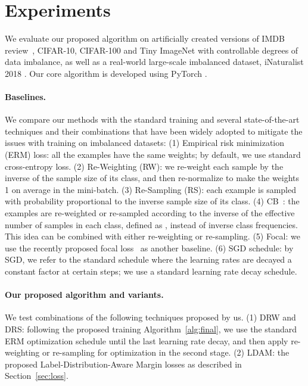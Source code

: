 \documentclass{article}
\newcommand{\ldam}{\textup{LDAM}}
\newcommand{\BMCE}{{\ldam}}
\newcommand{\tstagew}{DRW}
\newcommand{\tstages}{DRS}
\newcommand{\ERM}{ERM}
\begin{document}
\section{Experiments} \label{sec:experiments}

We evaluate our proposed algorithm on artificially created versions of IMDB review~\citep{maas2011learning}, CIFAR-10, CIFAR-100 \citep{krizhevsky2009learning}  and Tiny ImageNet \citep{russakovsky2015imagenet,tinyimagenet} with controllable degrees of data imbalance, as well as a real-world large-scale imbalanced dataset, iNaturalist 2018 \citep{van2018inaturalist}. Our core algorithm is developed using PyTorch \citep{paszke2017automatic}.
\paragraph{Baselines.}
We compare our methods with the standard training and several state-of-the-art techniques and their combinations that have been widely adopted to mitigate the issues with training on imbalanced datasets: (1) Empirical risk minimization (ERM) loss: all the examples have the same weights; by default, we use standard cross-entropy loss.  (2) Re-Weighting (RW): we re-weight each sample by the inverse of the sample size of its class, and then re-normalize to make the weights 1 on average in the mini-batch. (3) Re-Sampling (RS): each example is sampled with probability proportional to the inverse sample size of its class. (4) CB~\citep{cui2019classbalancedloss}: the examples are re-weighted or re-sampled according to the inverse of the effective number of samples in each class, defined as , instead of inverse class frequencies. This idea can be combined with either re-weighting or re-sampling. (5) Focal: we use the recently proposed focal loss~\citep{lin2017focal} as another baseline. (6) SGD schedule: by SGD, we refer to the standard schedule where the learning rates are decayed a constant factor at certain steps; we use a standard learning rate decay schedule. 


\paragraph{Our proposed algorithm and variants.} We test combinations of the following techniques proposed by us. (1) \tstagew{} and \tstages{}: following the proposed training Algorithm~\ref{alg:final}, we use the standard \ERM{} optimization schedule until the last learning rate decay, and then apply re-weighting or re-sampling for optimization in the second stage. (2) \BMCE{}: the proposed Label-Distribution-Aware Margin losses as described in Section~\ref{sec:loss}.
\end{document}

